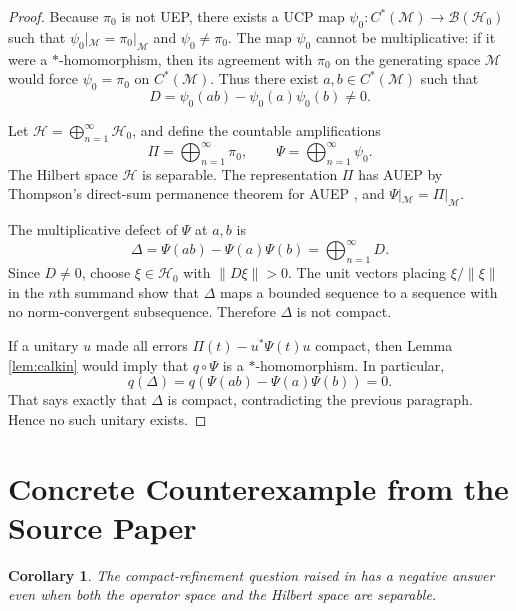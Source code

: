 \documentclass[11pt]{article}
\newtheorem{corollary}{Corollary}
\newcommand{\B}{\mathcal B}
\newcommand{\Hh}{\mathcal H}
\newcommand{\M}{\mathcal M}
\newcommand{\Cstar}{C^*}
\begin{document}
\begin{proof}
Because $\pi_0$ is not UEP, there exists a UCP map
$\psi_0:\Cstar(\M)\to\B(\Hh_0)$ such that
$\psi_0|_\M=\pi_0|_\M$ and $\psi_0\ne\pi_0$.  The map $\psi_0$ cannot be
multiplicative: if it were a $*$-homomorphism, then its agreement with $\pi_0$
on the generating space $\M$ would force $\psi_0=\pi_0$ on $\Cstar(\M)$.
Thus there exist $a,b\in\Cstar(\M)$ such that
\[
   D=\psi_0(ab)-\psi_0(a)\psi_0(b)\ne 0.
\]

Let $\Hh=\bigoplus_{n=1}^\infty \Hh_0$, and define the countable amplifications
\[
   \Pi=\bigoplus_{n=1}^\infty \pi_0,\qquad
   \Psi=\bigoplus_{n=1}^\infty \psi_0.
\]
The Hilbert space $\Hh$ is separable.  The representation $\Pi$ has AUEP by
Thompson's direct-sum permanence theorem for AUEP
\cite[Proposition 3.7]{ThompsonAUEP}, and $\Psi|_\M=\Pi|_\M$.

The multiplicative defect of $\Psi$ at $a,b$ is
\[
   \Delta=\Psi(ab)-\Psi(a)\Psi(b)=\bigoplus_{n=1}^\infty D.
\]
Since $D\ne0$, choose $\xi\in\Hh_0$ with $\|D\xi\|>0$.  The unit vectors placing
$\xi/\|\xi\|$ in the $n$th summand show that $\Delta$ maps a bounded sequence
to a sequence with no norm-convergent subsequence.  Therefore $\Delta$ is not
compact.

If a unitary $u$ made all errors $\Pi(t)-u^*\Psi(t)u$ compact, then
Lemma \ref{lem:calkin} would imply that $q\circ\Psi$ is a $*$-homomorphism.
In particular,
\[
   q(\Delta)
   =q(\Psi(ab)-\Psi(a)\Psi(b))
   =0.
\]
That says exactly that $\Delta$ is compact, contradicting the previous
paragraph.  Hence no such unitary exists.
\end{proof}

\section{Concrete Counterexample from the Source Paper}

\begin{corollary}\label{cor:cuntz}
The compact-refinement question raised in \cite{ThompsonAUEP} has a negative
answer even when both the operator space and the Hilbert space are separable.
\end{corollary}
\end{document}
